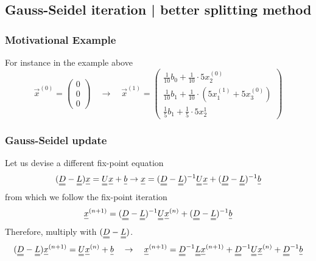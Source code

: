 \subsection{Gauss-Seidel iteration | better splitting method\skipthis}
\label{app:gauss_seidel}

\subsubsection{Motivational Example}
For instance in the example above
\begin{equation}
    \vec{x}^{(0)} = \left( \begin{array}{c} 0 \\ 0 \\ 0 \end{array} \right) \quad \rightarrow \quad \vec{x}^{(1)} = \left( \begin{array}{c} \frac{1}{10} b_0 + \frac{1}{10}\cdot 5 x^{(0)}_2 \\ \frac{1}{10} b_1 + \frac{1}{10}\cdot \left( 5 x^{(1)}_1 + 5 x^{(0)}_3 \right) \\ \frac{1}{5} b_1 + \frac{1}{5} \cdot 5 x^{1}_2 \end{array} \right)
\end{equation}

\subsubsection{Gauss-Seidel update}
Let us devise a different fix-point equation
\begin{equation}
    (\mat{D}-\mat{L}) \vec{x} = \mat{U} \vec{x} + \vec{b} \rightarrow \vec{x} = (\mat{D}- \mat{L})^{-1} \mat{U} \vec{x} + (\mat{D} - \mat{L})^{-1} \vec{b}
\end{equation}
from which we follow the fix-point iteration
\begin{equation}
    \vec{x}^{(n+1)} = (\mat{D} - \mat{L})^{-1} \mat{U} \vec{x}^{(n)} + (\mat{D} - \mat{L})^{-1} \vec{b}
\end{equation}
Therefore, multiply with $(\mat{D} - \mat{L})$.
\begin{equation}
    (\mat{D} - \mat{L}) \vec{x}^{(n+1)} = \mat{U} \vec{x}^{(n)} + \vec{b} \quad \rightarrow \quad \vec{x}^{(n+1)} = \mat{D}^{-1} \mat{L} \vec{x}^{(n+1)} + \mat{D}^{-1} \mat{U} \vec{x}^{(n)} + \mat{D}^{-1} \vec{b}
\end{equation}

